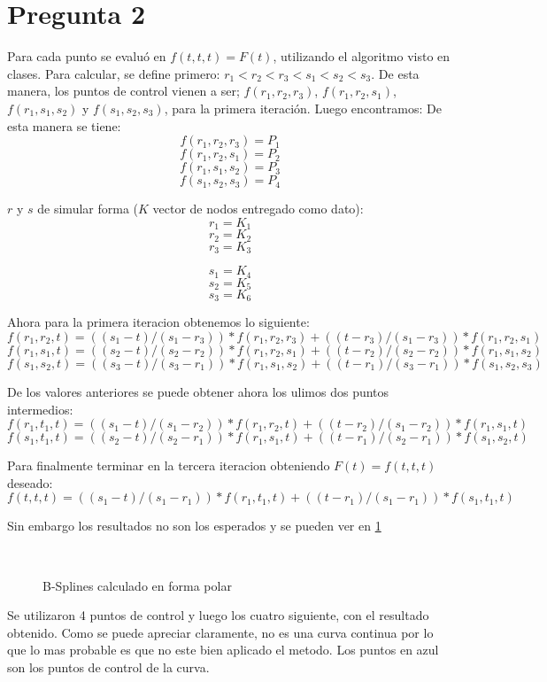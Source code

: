 \documentclass[a4paper,10pt]{article}
\begin{document}
\section{Pregunta 2}
Para cada punto se evaluó en $f(t,t,t)=F(t)$, utilizando el algoritmo visto en
clases. Para calcular, se define primero: $r_1 < r_2 < r_3 < s_1 < s_2 < s_3$.
De esta manera, los puntos de control vienen a ser; $f(r_1,r_2,r_3)$,
$f(r_1,r_2,s_1)$, $f(r_1,s_1,s_2)$ y $f(s_1,s_2,s_3)$, para la primera iteración. Luego encontramos:
De esta manera se tiene:
$$f(r_1,r_2,r_3) = P_1$$
$$f(r_1,r_2,s_1) = P_2$$
$$f(r_1,s_1,s_2) = P_3$$
$$f(s_1,s_2,s_3) = P_4$$

$r$ y $s$ de simular forma ($K$ vector de nodos entregado como dato):
$$r_1 = K_1$$
$$r_2 = K_2$$
$$r_3 = K_3$$

$$s_1 = K_4$$
$$s_2 = K_5$$
$$s_3 = K_6$$

Ahora para la primera iteracion obtenemos lo siguiente:
$$f(r_1,r_2,t) = ((s_1 - t)/(s_1-r_3))*f(r_1,r_2,r_3) + ((t - r_3)/(s_1 - r_3))*f(r_1,r_2,s_1)$$
$$f(r_1,s_1,t) = ((s_2 - t)/(s_2-r_2))*f(r_1,r_2,s_1) + ((t - r_2)/(s_2 - r_2))*f(r_1,s_1,s_2)$$
$$f(s_1,s_2,t) = ((s_3 - t)/(s_3-r_1))*f(r_1,s_1,s_2) + ((t - r_1)/(s_3 - r_1))*f(s_1,s_2,s_3)$$

De los valores anteriores se puede obtener ahora los ulimos dos puntos intermedios:
$$f(r_1,t_1,t) = ((s_1 - t)/(s_1-r_2))*f(r_1,r_2,t) + ((t - r_2)/(s_1 - r_2))*f(r_1,s_1,t)$$
$$f(s_1,t_1,t) = ((s_2 - t)/(s_2-r_1))*f(r_1,s_1,t) + ((t - r_1)/(s_2 - r_1))*f(s_1,s_2,t)$$

Para finalmente terminar en la tercera iteracion obteniendo $F(t)=f(t,t,t)$ deseado:
$$f(t,t,t) = ((s_1 - t)/(s_1-r_1))*f(r_1,t_1,t) + ((t - r_1)/(s_1 - r_1))*f(s_1,t_1,t)$$

Sin embargo los resultados no son los esperados y se pueden ver en \ref{fig:p2}
\begin{figure}[ht!]
  \centering
  ~ 
  \caption{B-Splines calculado en forma polar}
  \label{fig:p2}
\end{figure}
Se utilizaron 4 puntos de control y luego los cuatro siguiente, con el resultado obtenido. Como se puede apreciar claramente, no es una curva continua
por lo que lo mas probable es que no este bien aplicado el metodo. Los puntos en azul son los puntos de control de la curva.
\end{document}
